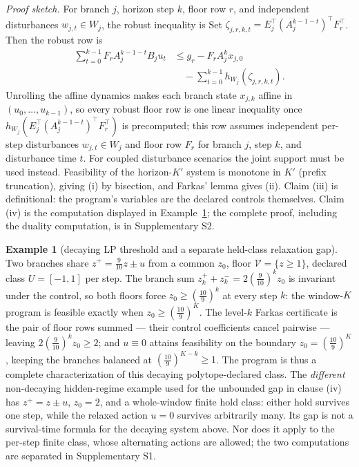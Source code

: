 \documentclass[10pt,twocolumn]{article}
\theoremstyle{definition}
\newtheorem{example}{Example}
\begin{document}
\emph{Proof sketch.} For branch \(j\), horizon step \(k\), floor row \(r\), and independent disturbances \(w_{j,t}\in W_j\), the robust inequality is
Set \(\zeta_{j,r,k,t}=E_j^{\top}(A_j^{k-1-t})^{\top}F_r^{\top}\). Then the robust row is
\[\begin{aligned}
\sum_{t=0}^{k-1}F_r A_j^{k-1-t}B_j u_t
&\le g_r-F_r A_j^k x_{j,0}\\
&\quad-\sum_{t=0}^{k-1}h_{W_j}(\zeta_{j,r,k,t}).
\end{aligned}\]
Unrolling the affine dynamics makes each branch state
\(x_{j,k}\) affine in \((u_{0},\dots,u_{k-1})\), so every robust floor row is one linear
inequality once \(h_{W_j}(E_j^{\top}(A_j^{k-1-t})^{\top}F_r^{\top})\) is precomputed; this row assumes independent per-step disturbances \(w_{j,t}\in W_j\) and floor row \(F_r\) for branch \(j\), step \(k\), and disturbance time \(t\). For coupled disturbance scenarios the joint support must be used instead. Feasibility of the
horizon-\(K'\) system is monotone in \(K'\) (prefix truncation), giving (i) by bisection, and
Farkas' lemma gives (ii). Claim (iii) is definitional: the program's variables are the declared
controls themselves. Claim (iv) is the computation displayed in
Example~\ref{calc-ex:relax-gap}; the complete proof, including the duality computation, is in
Supplementary S2.

\begin{example}[decaying LP threshold and a separate held-class relaxation gap]\label{calc-ex:relax-gap}
Two branches share \(z^{+} = \tfrac{9}{10} z \pm u\) from a common \(z_{0}\), floor
\(\mathcal{V} = \{z \ge 1\}\), declared class \(U = [-1,1]\) per step. The branch sum
\(z^{+}_{k} + z^{-}_{k} = 2 (\tfrac{9}{10})^{k} z_{0}\) is invariant under the control, so both
floors force \(z_{0} \ge (\tfrac{10}{9})^{k}\) at every step \(k\): the window-\(K\) program is
feasible exactly when \(z_{0} \ge (\tfrac{10}{9})^{K}\). The level-\(k\) Farkas certificate is
the pair of floor rows summed --- their control coefficients cancel pairwise --- leaving
\(2(\tfrac{9}{10})^{k} z_{0} \ge 2\); and \(u \equiv 0\) attains feasibility on the boundary
\(z_{0} = (\tfrac{10}{9})^{K}\), keeping the branches balanced at
\((\tfrac{10}{9})^{K-k} \ge 1\). The program is thus a complete characterization of this decaying
polytope-declared class. The \emph{different} non-decaying hidden-regime
example used for the unbounded gap in clause (iv) has
\(z^+=z\pm u\), \(z_0=2\), and a whole-window finite hold class:
either hold survives one step, while the relaxed action \(u=0\)
survives arbitrarily many. Its gap is not a survival-time formula for
the decaying system above. Nor does it apply to the per-step finite
class, whose alternating actions are allowed; the two computations
are separated in Supplementary S1.
\end{example}
\end{document}
